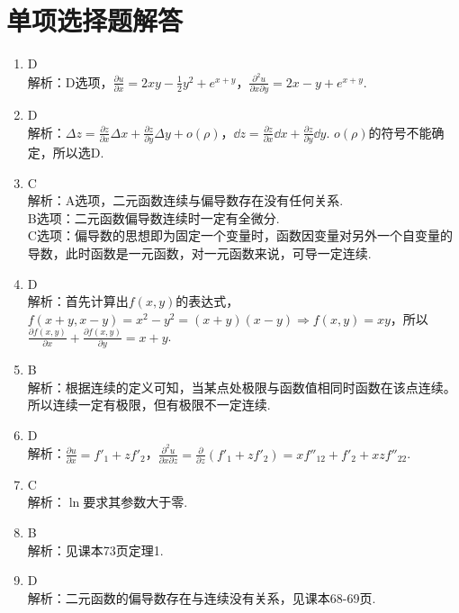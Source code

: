\section{单项选择题解答}
\begin{enumerate}
	\item D\\
		解析：D选项，$\frac{\partial u }{\partial x } = 2xy - \frac{1}{2}y^2 + e^{x+y} $，$\frac{\partial^2 u }{\partial x \partial y } = 2x - y + e^{x+y} $.
	\item D\\
		解析：$\Delta z = \frac{\partial z}{\partial x} \Delta x + \frac{\partial z}{\partial y} \Delta y + o(\rho)$，$ \dd z = \frac{\partial z}{\partial x} \dd x + \frac{\partial z}{\partial y} \dd y $. $o(\rho)$的符号不能确定，所以选D.
	\item C\\
		解析：A选项，二元函数连续与偏导数存在没有任何关系.\\
B选项：二元函数偏导数连续时一定有全微分.\\
C选项：偏导数的思想即为固定一个变量时，函数因变量对另外一个自变量的导数，此时函数是一元函数，对一元函数来说，可导一定连续.
	\item D\\
		解析：首先计算出$f(x,y)$的表达式，$f(x+y,x-y)=x^2-y^2 = (x+y)(x-y)\Rightarrow f(x,y)=xy$，所以$\frac{\partial f(x,y)}{\partial x}+\frac{\partial f(x,y)}{\partial y} = x+y$.
	\item B\\
		解析：根据连续的定义可知，当某点处极限与函数值相同时函数在该点连续。所以连续一定有极限，但有极限不一定连续.
	\item D\\
		解析：$ \frac{\partial u}{\partial x} = f'_1 + zf'_2 $，$ \frac{\partial^2 u}{\partial x \partial z}= \frac{\partial}{\partial z}\left(f'_1 + zf'_2\right) = xf''_{12} + f'_2 + xzf''_{22}$.
	\item C\\
		解析：$ \ln $要求其参数大于零.
	\item B\\
		解析：见课本73页定理1.
	\item D\\
		解析：二元函数的偏导数存在与连续没有关系，见课本68-69页.
\end{enumerate}
